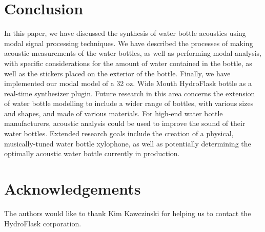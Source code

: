 \documentclass[twoside,a4paper]{article}
\begin{document}
%
\section{Conclusion} \label{sec:conclusion}
%
In this paper, we have discussed the synthesis of water bottle acoustics
using modal signal processing techniques. We have described the processes
of making acoustic measurements of the water bottles, as well as performing
modal analysis, with specific considerations for the amount of water
contained in the bottle, as well as the stickers placed on the exterior
of the bottle. Finally, we have implemented our modal model of a 32 oz.
Wide Mouth HydroFlask bottle as a real-time synthesizer plugin.
\newline\newline
Future research in this area concerns the extension of water bottle
modelling to include a wider range of bottles, with various sizes and
shapes, and made of various materials. For high-end water bottle
manufacturers, acoustic analysis could be used to improve the sound
of their water bottles. Extended research goals include the creation
of a physical, musically-tuned water bottle xylophone, as well as potentially
determining the optimally acoustic water bottle currently in production.

\section{Acknowledgements}
%
The authors would like to thank Kim Kawczinski for helping us to contact
the HydroFlask corporation.

\nocite{*}


\end{document}
